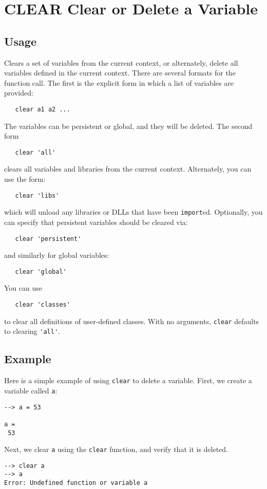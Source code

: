 \section{CLEAR Clear or Delete a Variable}

\subsection{Usage}

Clears a set of variables from the current context, or alternately, 
delete all variables defined in the current context.  There are
several formats for the function call.  The first is the explicit form
in which a list of variables are provided:
\begin{verbatim}
   clear a1 a2 ...
\end{verbatim}
The variables can be persistent or global, and they will be deleted.
The second form
\begin{verbatim}
   clear 'all'
\end{verbatim}
clears all variables and libraries from the current context.  Alternately, you can
use the form:
\begin{verbatim}
   clear 'libs'
\end{verbatim}
which will unload any libraries or DLLs that have been \verb|import|ed. 
Optionally, you can specify that persistent variables should be cleared via:
\begin{verbatim}
   clear 'persistent'
\end{verbatim}
and similarly for global variables:
\begin{verbatim}
   clear 'global'
\end{verbatim}
You can use
\begin{verbatim}
   clear 'classes'
\end{verbatim}
to clear all definitions of user-defined classes.
With no arguments, \verb|clear| defaults to clearing \verb|'all'|.
\subsection{Example}

Here is a simple example of using \verb|clear| to delete a variable.  First, we create a variable called \verb|a|:
\begin{verbatim}
--> a = 53

a = 
 53 
\end{verbatim}
Next, we clear \verb|a| using the \verb|clear| function, and verify that it is deleted.
\begin{verbatim}
--> clear a
--> a
Error: Undefined function or variable a
\end{verbatim}

